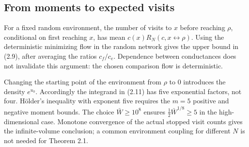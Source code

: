 \documentclass[10pt]{article}
\begin{document}
\subsection*{From moments to expected visits}
For a fixed random environment, the number of visits to \(x\) before reaching \(\rho\), conditional on first reaching \(x\), has mean \(c(x)R_N(c,x\leftrightarrow\rho)\). Using the deterministic minimizing flow in the random network gives the upper bound in (2.9), after averaging the ratios \(c_f/c_e\). Dependence between conductances does not invalidate this argument: the chosen comparison flow is deterministic.\par
Changing the starting point of the environment from \(\rho\) to 0 introduces the density \(e^{u_0}\). Accordingly the integrand in (2.11) has five exponential factors, not four. Hölder’s inequality with exponent five requires the \(m=5\) positive and negative moment bounds. The choice \(\bar W\geq10^8\) ensures \(\tfrac12\bar W^{1/8}\geq5\) in the high-dimensional case. Monotone convergence of the actual stopped visit counts gives the infinite-volume conclusion; a common environment coupling for different \(N\) is not needed for Theorem 2.1.\par
\end{document}
